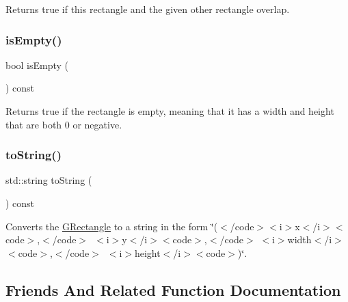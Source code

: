 Returns true if this rectangle and the given other rectangle overlap. 

\mbox{\label{structsgl_1_1GRectangle_acf82f9b2937375c7b1cf3dccb3df3312}} 
\subsubsection{\texorpdfstring{is\+Empty()}{isEmpty()}}
{\footnotesize\ttfamily bool is\+Empty (\begin{DoxyParamCaption}{ }\end{DoxyParamCaption}) const}



Returns {\ttfamily true} if the rectangle is empty, meaning that it has a width and height that are both 0 or negative. 

\mbox{\label{structsgl_1_1GRectangle_a1fe5121d6528fdea3f243321b3fa3a49}} 
\subsubsection{\texorpdfstring{to\+String()}{toString()}}
{\footnotesize\ttfamily std\+::string to\+String (\begin{DoxyParamCaption}{ }\end{DoxyParamCaption}) const}



Converts the {\ttfamily \mbox{\hyperlink{structsgl_1_1GRectangle}{G\+Rectangle}}} to a string in the form {\ttfamily \char`\"{}($<$/code$>$$<$i$>$x$<$/i$>$$<$code$>$,$<$/code$>$~$<$i$>$y$<$/i$>$$<$code$>$,$<$/code$>$
$<$i$>$width$<$/i$>$$<$code$>$,$<$/code$>$~$<$i$>$height$<$/i$>$$<$code$>$)\char`\"{}}. 



\subsection{Friends And Related Function Documentation}
\mbox{\label{structsgl_1_1GRectangle_ab1f9c96d97d7895bcd908ba94af3bed7}} 

